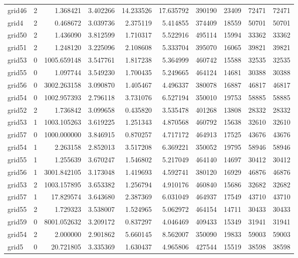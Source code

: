 \begin{longtable}{|l|r|r|r|r|r|r|r|r|r|}
grid46 & 2 & 1.368421 & 3.402266 & 14.233526 & 17.635792 & 390190 & 23409 & 72471 & 72471 \\
grid4 & 2 & 0.468672 & 3.039736 & 2.375119 & 5.414855 & 374409 & 18559 & 50701 & 50701 \\
grid50 & 2 & 1.436090 & 3.812599 & 1.710317 & 5.522916 & 495114 & 15994 & 33362 & 33362 \\
grid51 & 2 & 1.248120 & 3.225096 & 2.108608 & 5.333704 & 395070 & 16065 & 39821 & 39821 \\
grid53 & 0 & 1005.659148 & 3.547761 & 1.817238 & 5.364999 & 460742 & 15588 & 32535 & 32535 \\
grid55 & 0 & 1.097744 & 3.549230 & 1.700435 & 5.249665 & 464124 & 14681 & 30388 & 30388 \\
grid56 & 0 & 3002.263158 & 3.090870 & 1.405467 & 4.496337 & 380078 & 16887 & 46817 & 46817 \\
grid54 & 0 & 1002.957393 & 2.796118 & 3.731076 & 6.527194 & 350010 & 19753 & 58885 & 58885 \\
grid52 & 2 & 1.736842 & 3.099658 & 0.435820 & 3.535478 & 401268 & 13808 & 28332 & 28332 \\
grid53 & 1 & 1003.105263 & 3.619225 & 1.251343 & 4.870568 & 460792 & 15638 & 32610 & 32610 \\
grid57 & 0 & 1000.000000 & 3.846915 & 0.870257 & 4.717172 & 464913 & 17525 & 43676 & 43676 \\
grid54 & 1 & 2.263158 & 2.852013 & 3.517208 & 6.369221 & 350052 & 19795 & 58946 & 58946 \\
grid55 & 1 & 1.255639 & 3.670247 & 1.546802 & 5.217049 & 464140 & 14697 & 30412 & 30412 \\
grid56 & 1 & 3001.842105 & 3.173048 & 1.419693 & 4.592741 & 380120 & 16929 & 46876 & 46876 \\
grid53 & 2 & 1003.157895 & 3.653382 & 1.256794 & 4.910176 & 460840 & 15686 & 32682 & 32682 \\
grid57 & 1 & 17.829574 & 3.643680 & 2.387369 & 6.031049 & 464937 & 17549 & 43710 & 43710 \\
grid55 & 2 & 1.729323 & 3.538007 & 1.524965 & 5.062972 & 464154 & 14711 & 30433 & 30433 \\
grid59 & 0 & 8001.052632 & 3.209172 & 0.837297 & 4.046469 & 409433 & 15349 & 31941 & 31941 \\
grid54 & 2 & 2.000000 & 2.901862 & 5.660145 & 8.562007 & 350090 & 19833 & 59003 & 59003 \\
grid5 & 0 & 20.721805 & 3.335369 & 1.630437 & 4.965806 & 427544 & 15519 & 38598 & 38598 \\

\end{longtable}
